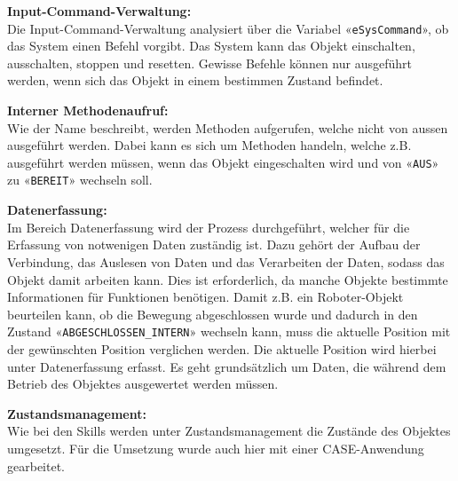 		\textbf{Input-Command-Verwaltung:}
		\vspace{2mm} 
		\\
		Die Input-Command-Verwaltung analysiert über die Variabel «\verb|eSysCommand|», ob das System einen Befehl vorgibt. Das System kann das Objekt einschalten, ausschalten, stoppen und resetten. Gewisse Befehle können nur ausgeführt werden, wenn sich das Objekt in einem bestimmen Zustand befindet.
		
		\textbf{Interner Methodenaufruf:}
		\vspace{2mm} 
		\\
		Wie der Name beschreibt, werden Methoden aufgerufen, welche nicht von aussen ausgeführt werden. Dabei kann es sich um Methoden handeln, welche z.B. ausgeführt werden müssen, wenn das Objekt eingeschalten wird und von «\verb|AUS|» zu «\verb|BEREIT|» wechseln soll.
		
		\textbf{Datenerfassung:}
		\vspace{2mm} 
		\\
		Im Bereich Datenerfassung wird der Prozess durchgeführt, welcher für die Erfassung von notwenigen Daten zuständig ist. Dazu gehört der Aufbau der Verbindung, das Auslesen von Daten und das Verarbeiten der Daten, sodass das Objekt damit arbeiten kann. Dies ist erforderlich, da manche Objekte bestimmte Informationen für Funktionen benötigen. Damit z.B. ein Roboter-Objekt beurteilen kann, ob die Bewegung abgeschlossen wurde und dadurch in den Zustand «\verb|ABGESCHLOSSEN_INTERN|» wechseln kann, muss die aktuelle Position mit der gewünschten Position verglichen werden. Die aktuelle Position wird hierbei unter Datenerfassung erfasst. Es geht grundsätzlich um Daten, die während dem Betrieb des Objektes ausgewertet werden müssen. 
		
		\newpage
		
		\textbf{Zustandsmanagement: }
		\vspace{2mm} 
		\\
		Wie bei den Skills werden unter Zustandsmanagement die Zustände des Objektes umgesetzt. Für die Umsetzung wurde auch hier mit einer CASE-Anwendung gearbeitet.
		
